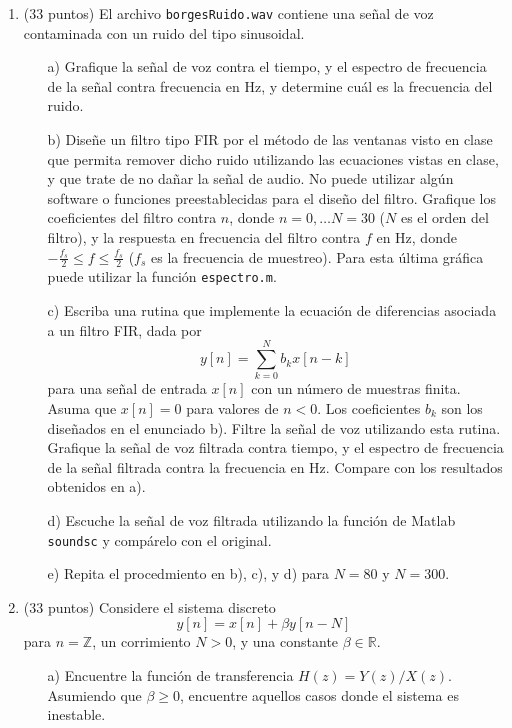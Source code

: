 \documentclass[11pt,spanish]{article}
\begin{document}
\begin{enumerate}
       \item (33 puntos) El archivo \texttt{borgesRuido.wav} contiene una señal de voz contaminada con un ruido del tipo sinusoidal.
          \begin{enumerate}[label=\textbf{\Alph*)},ref=\Alph*,leftmargin=*]
           \item[a)] Grafique la señal de voz contra el tiempo, y el espectro de frecuencia de la señal contra frecuencia en Hz, y determine cuál es la frecuencia del ruido.
           \item[b)] Diseñe un filtro tipo FIR por el método de las ventanas visto en clase que permita remover dicho ruido utilizando las ecuaciones vistas en clase, y que trate de no dañar la señal de audio. No puede utilizar algún software o funciones preestablecidas para el diseño del filtro. Grafique los coeficientes del filtro contra $n$, donde $n=0,\ldots N=30$ ($N$ es el orden del filtro), y la respuesta en frecuencia del filtro contra $f$ en Hz, donde $-\frac{f_s}{2}\le f\le \frac{f_s}{2}$  ($f_s$ es la frecuencia de muestreo). Para esta última gráfica puede utilizar la función \texttt{espectro.m}.
           \item[c)] Escriba una rutina que implemente la ecuación de diferencias asociada a un filtro FIR, dada por
           \[
           y[n]=\sum_{k=0}^{N} b_k x[n-k]
           \]
           para una señal de entrada $x[n]$ con un número de muestras finita. Asuma que $x[n]=0$ para valores de $n<0$. Los coeficientes $b_k$ son los diseñados en el enunciado b). Filtre la señal de voz utilizando esta rutina. Grafique la señal de voz filtrada contra tiempo, y el espectro de frecuencia de la señal filtrada contra la frecuencia en Hz. Compare con los resultados obtenidos en a).
           \item[d)] Escuche la señal de voz filtrada utilizando la función de Matlab \texttt{soundsc} y compárelo con el original.
           \item[e)] Repita el procedmiento en b), c), y d) para $N=80$ y $N=300$.
      \end{enumerate}
      \vspace{1cm}
\item (33 puntos) Considere el sistema discreto
  \[
     y[n]=x[n]+\beta y[n-N]
  \]
  para $n=\mathbb{Z}$, un corrimiento $N>0$, y una constante $\beta\in \mathbb{R}$.
      \begin{enumerate}[label=\textbf{\Alph*)},ref=\Alph*,leftmargin=*]
        \item[a)] Encuentre la función de transferencia $H(z)=Y(z)/X(z)$. Asumiendo que $\beta\ge0$, encuentre aquellos casos donde el sistema es inestable.

\end{enumerate}
\end{enumerate}
\end{document}
